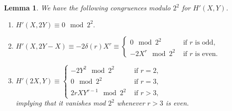\documentclass[11pt, reqno]{amsart}
\numberwithin{equation}{section}
\newtheorem{lemma}[thm]{Lemma}
\theoremstyle{definition}
\theoremstyle{remark}
\theoremstyle{definition}
\theoremstyle{remark}
\theoremstyle{remark}
\begin{document}
\begin{lemma}\label{hprime}
We have the following congruences modulo $2^2$ for $H'(X,Y)$.
\begin{enumerate}[label=(\alph*)]	
\item  $H'(X,2Y) \equiv 0 \mod 2^2.$ \label{H'a}
\item  $H'(X,2Y-X) \equiv -2\delta(r)X^{r}\equiv\begin{cases}
 0\mod 2^2& \text{ if } r \text{ is odd, }\\
 -2X^{r} \mod 2^2 & \text{ if }r \text{ is even}.
 \end{cases}$ \label{H'b}
	\item  $H'(2X,Y)\equiv \begin{cases}
   -2Y^2 \mod 2^2 & \text{ if }r=2,\\
    0  \mod 2^{2} & \text{ if } r=3,\\
    2rXY^{r-1} \mod 2^{2} & \text{ if }r>3,
    \end{cases} $    \label{H'c}\\
    
implying that it vanishes mod $2^2$ whenever $r>3$ is even.
 \end{enumerate}
\end{lemma}
\end{document}

